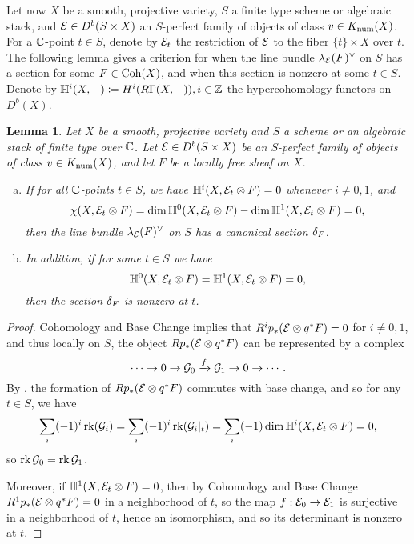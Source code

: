 \documentclass[letterpaper,11pt]{amsart}%
\newtheorem{lem}[thm]{Lemma}
\theoremstyle{remark}
\begin{document}
Let now $X$ be a smooth, projective variety, $S$ a finite type scheme or algebraic stack, and $\mathcal{E} \in D^b(S \times X)$ an $S$-perfect family of objects of class $v \in K_{\mathrm{num}}(X)$. For a $\mathbb{C}$-point $t \in S$, denote by $\mathcal{E}_t$ the restriction of $\mathcal{E}$ to the fiber $\{t\} \times X$ over $t$. The following lemma gives a criterion for when the line bundle $\lambda_{\mathcal{E}}(F)^\vee$ on $S$ has a section for some $F \in \mathrm{Coh}(X)$, and when this section is nonzero at some $t \in S$. Denote by $\mathbb{H}^i(X, -) \coloneqq H^i(R\Gamma(X, -)), i \in \mathbb{Z}$ the hypercohomology functors on $D^b(X)$.
\begin{lem}\label{detsection}
    Let $X$ be a smooth, projective variety and $S$ a scheme or an algebraic stack of finite type over $\mathbb{C}$. Let $\mathcal{E} \in D^b(S \times X)$ be an $S$-perfect family of objects of class $v \in K_{\mathrm{num}}(X)$, and let $F$ be a locally free sheaf on $X$.
    \begin{enumerate}[(a)]
        \item If for all $\mathbb{C}$-points $t \in S$, we have $\mathbb{H}^i(X, \mathcal{E}_t \otimes F) = 0$ whenever $i \neq 0, 1$, and 
        \[ \chi(X, \mathcal{E}_t \otimes F) = \dim \mathbb{H}^0(X, \mathcal{E}_t \otimes F) - \dim \mathbb{H}^1(X, \mathcal{E}_t \otimes F) = 0, \]
        then the line bundle $\lambda_{\mathcal{E}}(F)^\vee$ on $S$ has a canonical section $\delta_F$.
        \item In addition, if for some $t \in S$ we have 
        \[ \mathbb{H}^0(X, \mathcal{E}_t \otimes F) = \mathbb{H}^1(X, \mathcal{E}_t \otimes F) = 0, \]
        then the section $\delta_F$ is nonzero at $t$.
    \end{enumerate}
\end{lem}
\begin{proof}
    Cohomology and Base Change implies that $R^i p_*(\mathcal{E} \otimes q^* F) = 0$ for $i \neq 0,1$, and thus locally on $S$, the object $R p_*(\mathcal{E} \otimes q^*F)$ can be represented by a complex
    \[ \cdots \to 0 \to \mathcal{G}_0 \xrightarrow{f} \mathcal{G}_1 \to 0 \to \cdots. \]
    By \cite[\href{https://stacks.math.columbia.edu/tag/0B91}{Tag 0B91}]{stacks-project}, the formation of $R p_*(\mathcal{E} \otimes q^*F)$ commutes with base change, and so for any $t \in S$, we have 
    \[ \sum_i (-1)^i \operatorname{\mathrm{rk}}(\mathcal{G}_i) = \sum_i (-1)^i \operatorname{\mathrm{rk}}(\mathcal{G}_i|_t) = \sum_i (-1) \dim \mathbb{H}^i(X, \mathcal{E}_t \otimes F) = 0, \]
    so $\operatorname{\mathrm{rk}} \mathcal{G}_0 = \operatorname{\mathrm{rk}} \mathcal{G}_1$.
    
    Moreover, if $\mathbb{H}^1(X, \mathcal{E}_t \otimes F) = 0$, then by Cohomology and Base Change $R^1 p_*(\mathcal{E} \otimes q^*F) = 0$ in a neighborhood of $t$, so the map $f: \mathcal{E}_0 \to \mathcal{E}_1$ is surjective in a neighborhood of $t$, hence an isomorphism, and so its determinant is nonzero at $t$.
\end{proof}
\end{document}
